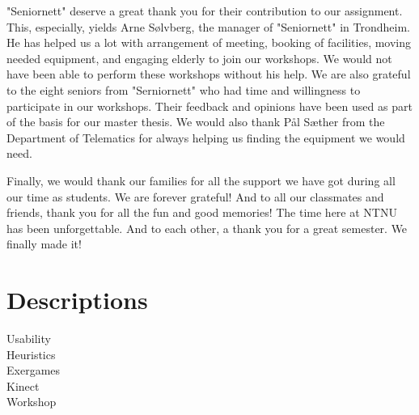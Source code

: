 \documentclass[b5paper,twoside,openright,11pt]{report}
\begin{document}
"Seniornett" deserve a great thank you for their contribution to our assignment. This, especially, yields Arne Sølvberg, the manager of "Seniornett" in Trondheim. He has helped us a lot with arrangement of meeting, booking of facilities, moving needed equipment, and engaging elderly to join our workshops. We would not have been able to perform these workshops without his help. We are also grateful to the eight seniors from "Serniornett" who had time and willingness to participate in our workshops. Their feedback and opinions have been used as part of the basis for our master thesis. We would also thank Pål Sæther from the Department of Telematics for always helping us finding the equipment we would need.        

Finally, we would thank our families for all the support we have got during all our time as students. We are forever grateful! And to all our classmates and friends, thank you for all the fun and good memories! The time here at NTNU has been unforgettable. And to each other, a thank you for a great semester. We finally made it!   

\cleardoublepage
{}
\tableofcontents
\cleardoublepage

\cleardoublepage
\listoffigures
\cleardoublepage
\listoftables
\cleardoublepage
{}
\pagestyle{fancy}
\fancyhead[LE]{\thepage}
\fancyhead[RE]{\leftmark}
\fancyhead[RO]{\thepage}
\fancyhead[LO]{\rightmark}
\fancyfoot{}
\chapter*{Descriptions}
Usability \\
Heuristics \\ 
Exergames \\
Kinect \\ 
Workshop \\

\cleardoublepage

\cleardoublepage

\cleardoublepage

\cleardoublepage

\cleardoublepage

\cleardoublepage

\cleardoublepage

\cleardoublepage

\cleardoublepage

\cleardoublepage

\cleardoublepage

\cleardoublepage

\cleardoublepage


\pagestyle{plain}
\cleardoublepage
\appendix 
  
\cleardoublepage
\end{document}
